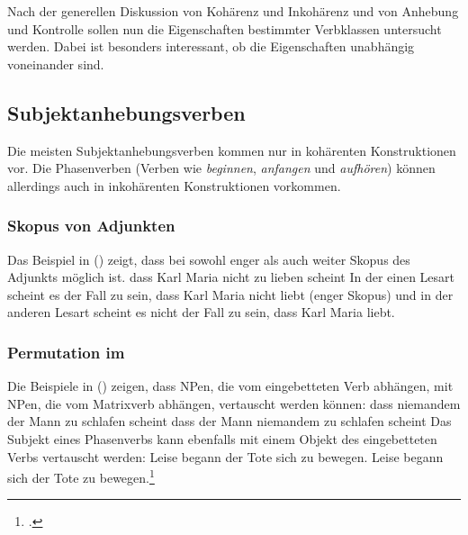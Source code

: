 Nach der generellen Diskussion von Kohärenz und Inkohärenz und von Anhebung und Kontrolle
sollen nun die Eigenschaften bestimmter Verbklassen untersucht werden. Dabei ist besonders
interessant, ob die Eigenschaften unabhängig voneinander sind.

\subsection{Subjektanhebungsverben}
\label{sec-subj-raising-verbs-phen}
\label{sec-phase-verbs-phen}

Die meisten Subjektanhebungsverben kommen nur in kohärenten Konstruktionen vor.
Die Phasenverben (Verben wie \emph{beginnen}, \emph{anfangen} und \emph{aufhören})
können allerdings auch in inkohärenten Konstruktionen vorkommen.

\subsubsection{Skopus von Adjunkten}
\label{sec-subj-rais-scope}

Das Beispiel in () zeigt, dass bei  sowohl enger als auch weiter
Skopus des Adjunkts möglich ist.
\eal
dass Karl Maria nicht zu lieben scheint
\zl
In der einen Lesart scheint es der Fall zu sein, dass Karl Maria nicht liebt (enger Skopus) und in der
anderen Lesart scheint es nicht der Fall zu sein, dass Karl Maria liebt.




\subsubsection{Permutation im \mf}
\label{sec-subj-rais-perm-mf}

Die Beispiele in () zeigen, dass NPen, die vom eingebetteten Verb abhängen,
mit NPen, die vom Matrixverb abhängen, vertauscht werden können:
\eal
\ex 
dass niemandem    der Mann zu schlafen scheint
\ex 
dass der Mann niemandem zu schlafen scheint
\zl
Das Subjekt eines Phasenverbs kann ebenfalls mit einem Objekt des
eingebetteten Verbs vertauscht werden:
\eal
\ex 
Leise   begann der Tote     sich zu bewegen.
\ex 
Leise   begann sich der Tote     zu bewegen.\footnote{
        .
    }
\zl


